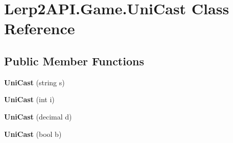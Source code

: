 \hypertarget{class_lerp2_a_p_i_1_1_game_1_1_uni_cast}{}\section{Lerp2\+A\+P\+I.\+Game.\+Uni\+Cast Class Reference}
\label{class_lerp2_a_p_i_1_1_game_1_1_uni_cast}
\subsection*{Public Member Functions}
\begin{DoxyCompactItemize}
\item 
\mbox{\label{class_lerp2_a_p_i_1_1_game_1_1_uni_cast_a6289e1b6b4ff6ae7287e4f304b22d087}} 
{\bfseries Uni\+Cast} (string s)
\item 
\mbox{\label{class_lerp2_a_p_i_1_1_game_1_1_uni_cast_add37c0736524043407545239380babde}} 
{\bfseries Uni\+Cast} (int i)
\item 
\mbox{\label{class_lerp2_a_p_i_1_1_game_1_1_uni_cast_ae6f6b405e50262d6d9c4ca03a255c219}} 
{\bfseries Uni\+Cast} (decimal d)
\item 
\mbox{\label{class_lerp2_a_p_i_1_1_game_1_1_uni_cast_a12ebf426db671515de776a0a42ff98ae}} 
{\bfseries Uni\+Cast} (bool b)
\end{DoxyCompactItemize}
